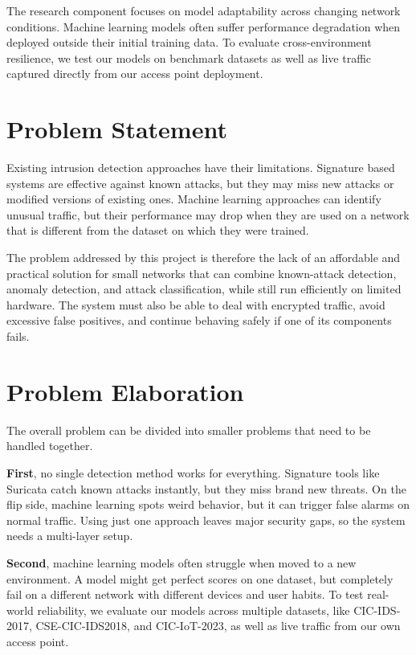 \noindent The research component focuses on model adaptability across changing network conditions. Machine learning models often suffer performance degradation when deployed outside their initial training data. To evaluate cross-environment resilience, we test our models on benchmark datasets as well as live traffic captured directly from our access point deployment.

\section{Problem Statement}\label{sec:2.2}

\noindent Existing intrusion detection approaches have their limitations. Signature based systems are effective against known attacks, but they may miss new attacks or modified versions of existing ones. Machine learning approaches can identify unusual traffic, but their performance may drop when they are used on a network that is different from the dataset on which they were trained.

\noindent The problem addressed by this project is therefore the lack of an affordable and practical solution for small networks that can combine known-attack detection, anomaly detection, and attack classification, while still run efficiently on limited hardware. The system must also be able to deal with encrypted traffic, avoid excessive false positives, and continue behaving safely if one of its components fails.

\section{Problem Elaboration}\label{sec:2.3}

\noindent The overall problem can be divided into smaller problems that need to be handled together.

\noindent \textbf{First}, no single detection method works for everything. Signature tools like Suricata catch known attacks instantly, but they miss brand new threats. On the flip side, machine learning spots weird behavior, but it can trigger false alarms on normal traffic. Using just one approach leaves major security gaps, so the system needs a multi-layer setup.

\noindent \textbf{Second}, machine learning models often struggle when moved to a new environment. A model might get perfect scores on one dataset, but completely fail on a different network with different devices and user habits. To test real-world reliability, we evaluate our models across multiple datasets, like CIC-IDS-2017, CSE-CIC-IDS2018, and CIC-IoT-2023, as well as live traffic from our own access point.

